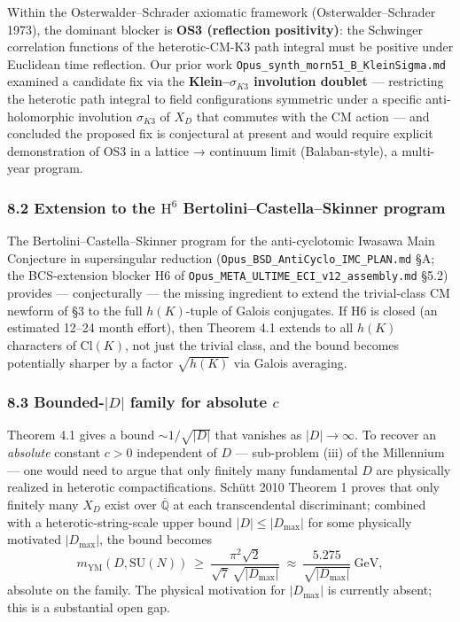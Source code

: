 \documentclass[
  11pt,
  a4paper,
]{amsart}
\begin{document}
Within the Osterwalder--Schrader axiomatic framework (Osterwalder--Schrader 1973), the dominant blocker is \textbf{OS3 (reflection positivity)}: the Schwinger correlation functions of the heterotic-CM-K3 path integral must be positive under Euclidean time reflection. Our prior work \texttt{Opus\_synth\_morn51\_B\_KleinSigma.md} examined a candidate fix via the \textbf{Klein--\(\sigma_{K3}\) involution doublet} --- restricting the heterotic path integral to field configurations symmetric under a specific anti-holomorphic involution \(\sigma_{K3}\) of \(X_D\) that commutes with the CM action --- and concluded the proposed fix is conjectural at present and would require explicit demonstration of OS3 in a lattice → continuum limit (Balaban-style), a multi-year program.

\hypertarget{extension-to-the-mathrmh6-bertolinicastellaskinner-program}{%
\subsubsection{\texorpdfstring{8.2 Extension to the \(\mathrm{H}^6\) Bertolini--Castella--Skinner program}{8.2 Extension to the \textbackslash mathrm\{H\}\^{}6 Bertolini--Castella--Skinner program}}\label{extension-to-the-mathrmh6-bertolinicastellaskinner-program}}

The Bertolini--Castella--Skinner program for the anti-cyclotomic Iwasawa Main Conjecture in supersingular reduction (\texttt{Opus\_BSD\_AntiCyclo\_IMC\_PLAN.md} §A; the BCS-extension blocker H6 of \texttt{Opus\_META\_ULTIME\_ECI\_v12\_assembly.md} §5.2) provides --- conjecturally --- the missing ingredient to extend the trivial-class CM newform of §3 to the full \(h(K)\)-tuple of Galois conjugates. If H6 is closed (an estimated 12--24 month effort), then Theorem 4.1 extends to all \(h(K)\) characters of \(\mathrm{Cl}(K)\), not just the trivial class, and the bound becomes potentially sharper by a factor \(\sqrt{h(K)}\) via Galois averaging.

\hypertarget{bounded-d-family-for-absolute-c}{%
\subsubsection{\texorpdfstring{8.3 Bounded-\(|D|\) family for absolute \(c\)}{8.3 Bounded-\textbar D\textbar{} family for absolute c}}\label{bounded-d-family-for-absolute-c}}

Theorem 4.1 gives a bound \(\sim 1/\sqrt{|D|}\) that vanishes as \(|D| \to \infty\). To recover an \emph{absolute} constant \(c > 0\) independent of \(D\) --- sub-problem (iii) of the Millennium --- one would need to argue that only finitely many fundamental \(D\) are physically realized in heterotic compactifications. Schütt 2010 Theorem 1 proves that only finitely many \(X_D\) exist over \(\overline{\mathbb{Q}}\) at each transcendental discriminant; combined with a heterotic-string-scale upper bound \(|D| \le |D_{\max}|\) for some physically motivated \(|D_{\max}|\), the bound becomes
\[
m_{\mathrm{YM}}(D, \mathrm{SU}(N))\ \ge\ \frac{\pi^2 \sqrt{2}}{\sqrt{7}\,\sqrt{|D_{\max}|}}\ \approx\ \frac{5.275}{\sqrt{|D_{\max}|}}\ \mathrm{GeV},
\]
absolute on the family. The physical motivation for \(|D_{\max}|\) is currently absent; this is a substantial open gap.
\end{document}
